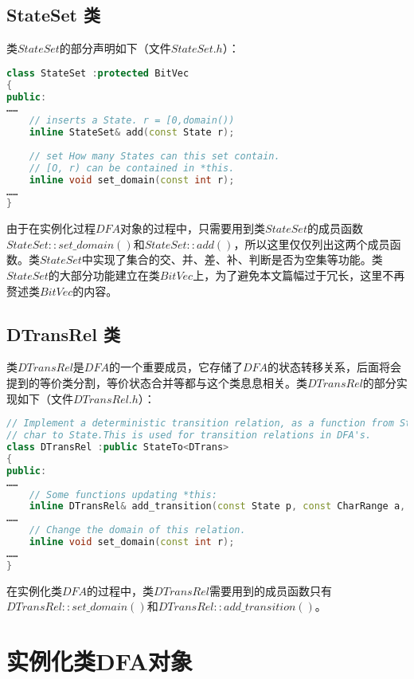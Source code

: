 \subsection{StateSet 类}
类$StateSet$的部分声明如下（文件$StateSet.h$）：
\lstset{style=mystyle}
\begin{lstlisting}[language=C++,label={lst:StateSet},caption={StateSet}]
class StateSet :protected BitVec
{
public:
……
    // inserts a State. r = [0,domain())
    inline StateSet& add(const State r);
    
    // set How many States can this set contain.
    // [O, r) can be contained in *this.
    inline void set_domain(const int r);
……
}
\end{lstlisting}
由于在实例化过程$DFA$对象的过程中，只需要用到类$StateSet$的成员函数$StateSet::set\_domain()$和$StateSet::add()$，所以这里仅仅列出这两个成员函数。类$StateSet$中实现了集合的交、并、差、补、判断是否为空集等功能。类$StateSet$的大部分功能建立在类$BitVec$上，为了避免本文篇幅过于冗长，这里不再赘述类$BitVec$的内容。


\subsection{DTransRel 类}

类$DTransRel$是$DFA$的一个重要成员，它存储了$DFA$的状态转移关系，后面将会提到的等价类分割，等价状态合并等都与这个类息息相关。类$DTransRel$的部分实现如下（文件$DTransRel.h$）：
\lstset{style=mystyle}
\begin{lstlisting}[language=C++,label={lst:DTransRel},caption={DTransRel}]
// Implement a deterministic transition relation, as a function from States time
// char to State.This is used for transition relations in DFA's.
class DTransRel :public StateTo<DTrans>
{
public:
……
    // Some functions updating *this:
    inline DTransRel& add_transition(const State p, const CharRange a, const State q);
……
    // Change the domain of this relation.
    inline void set_domain(const int r);
……
}
\end{lstlisting}
在实例化类$DFA$的过程中，类$DTransRel$需要用到的成员函数只有$DTransRel::set\_domain()$和$DTransRel::add\_transition()$。







\section{实例化类DFA对象}\label{sec:get_a_dfa}


